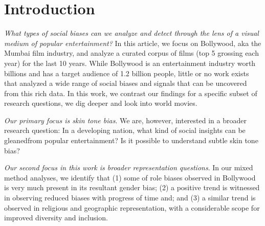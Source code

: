 \section{Introduction}
\label{sec:intro}

    \textit{What types of social biases can we analyze and detect through the lens of a visual medium of popular entertainment?} In this article, we focus on Bollywood, aka the Mumbai film industry, and analyze a curated corpus of films (top 5 grossing each year) for the last 10 years. While Bollywood is an entertainment industry worth billions and has a target audience of 1.2 billion
    people, little or no work exists that analyzed a wide range of social biases and signals that can be uncovered from this rich data. In this work, we contrast our findings for a specific subset of research questions, we dig deeper and look into world movies.

    \textit{Our primary focus is skin tone bias}. We are, however, interested in a broader research question: In a developing nation, what kind of social insights can be gleanedfrom popular entertainment? Is it possible to understand subtle skin tone bias? 

    \textit{Our second focus in this work is broader representation questions}. In our mixed method analyses, we identify that (1) some of role biases observed in Bollywood is very much present in its resultant gender bias; (2) a positive trend is witnessed in observing reduced biases with progress of time and; and (3) a similar trend is observed in religious and geographic representation, with a
    considerable scope for improved diversity and inclusion.